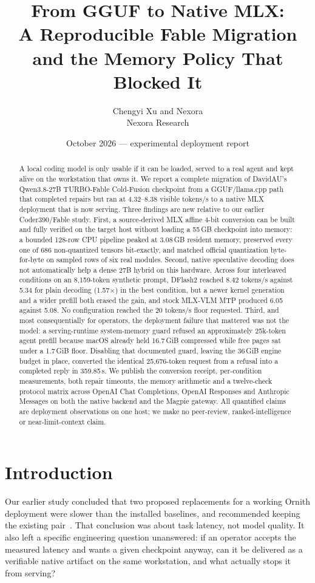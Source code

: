 \documentclass[11pt]{article}
\title{\textbf{From GGUF to Native MLX:\\A Reproducible Fable Migration and the Memory Policy That Blocked It}}
\author{Chengyi Xu and Nexora\\\small Nexora Research}
\date{October 2026 --- experimental deployment report}
\begin{document}
\maketitle

\begin{abstract}
A local coding model is only usable if it can be loaded, served to a real agent and kept alive on the workstation that owns it. We report a complete migration of DavidAU's Qwen3.8-27B TURBO-Fable Cold-Fusion checkpoint from a GGUF/llama.cpp path that completed repairs but ran at 4.32--8.38 visible tokens/s to a native MLX deployment that is now serving. Three findings are new relative to our earlier Coder390/Fable study. First, a source-derived MLX affine 4-bit conversion can be built and fully verified on the target host without loading a 55\,GB checkpoint into memory: a bounded 128-row CPU pipeline peaked at 3.08\,GB resident memory, preserved every one of 686 non-quantized tensors bit-exactly, and matched official quantization byte-for-byte on sampled rows of six real modules. Second, native speculative decoding does not automatically help a dense 27B hybrid on this hardware. Across four interleaved conditions on an 8{,}159-token synthetic prompt, DFlash2 reached 8.42 tokens/s against 5.34 for plain decoding (1.57$\times$) in the best condition, but a newer kernel generation and a wider prefill both erased the gain, and stock MLX-VLM MTP produced 6.05 against 5.08. No configuration reached the 20 tokens/s floor requested. Third, and most consequentially for operators, the deployment failure that mattered was not the model: a serving-runtime system-memory guard refused an approximately 25k-token agent prefill because macOS already held 16.7\,GiB compressed while free pages sat under a 1.7\,GiB floor. Disabling that documented guard, leaving the 36\,GiB engine budget in place, converted the identical 25{,}676-token request from a refusal into a completed reply in 359.85\,s. We publish the conversion receipt, per-condition measurements, both repair timeouts, the memory arithmetic and a twelve-check protocol matrix across OpenAI Chat Completions, OpenAI Responses and Anthropic Messages on both the native backend and the Magpie gateway. All quantified claims are deployment observations on one host; we make no peer-review, ranked-intelligence or near-limit-context claim.
\end{abstract}

\section{Introduction}
Our earlier study concluded that two proposed replacements for a working Ornith deployment were slower than the installed baselines, and recommended keeping the existing pair~\cite{prior}. That conclusion was about task latency, not model quality. It also left a specific engineering question unanswered: if an operator accepts the measured latency and wants a given checkpoint anyway, can it be delivered as a verifiable native artifact on the same workstation, and what actually stops it from serving?
\end{document}
